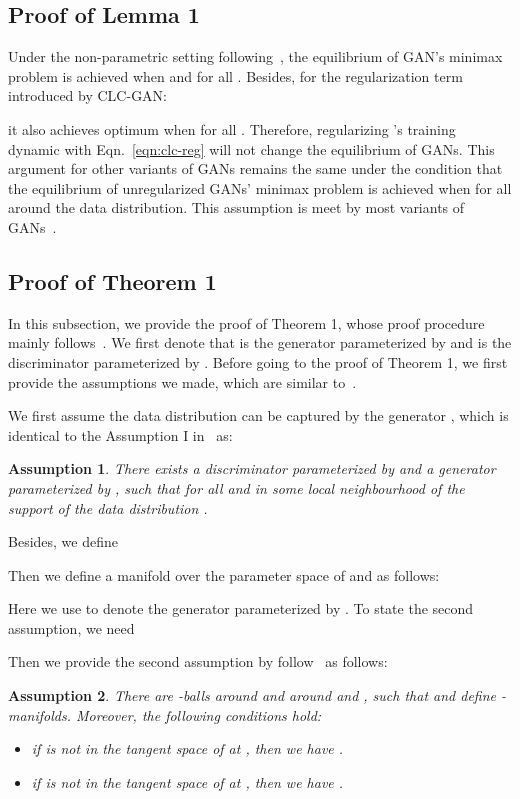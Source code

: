 \documentclass{article}
\newcommand{\eqn}[1]{Eqn.~\eqref{eqn:#1}}
\newtheorem{assumption}{Assumption}
\theoremstyle{definition}
\begin{document}
\subsection{Proof of Lemma 1}

Under the non-parametric setting following~\citet{goodfellow2014generative}, the equilibrium of GAN's minimax problem is achieved when  and  for all . Besides, for the regularization term introduced by CLC-GAN:

it also achieves optimum when  for all . Therefore, regularizing 's training dynamic with \eqn{clc-reg} will not change the equilibrium of GANs. This argument for other variants of GANs remains the same under the condition that the equilibrium of unregularized GANs' minimax problem is achieved when  for all  around the data distribution. This assumption is meet by most variants of GANs~\cite{arjovsky2017wasserstein,mao2017least,miyato2018spectral,zhang2019consistency}.

\subsection{Proof of Theorem 1}

In this subsection, we provide the proof of Theorem 1, whose proof procedure mainly follows~\citet{mescheder2018training}. We first denote that  is the generator parameterized by  and  is the discriminator parameterized by .
Before going to the proof of Theorem 1, we first provide the assumptions we made, which are similar to~\cite{mescheder2018training}.

We first assume the data distribution can be captured by the generator , which is identical to the Assumption I in~\cite{mescheder2018training} as:
\begin{assumption}
There exists a discriminator  parameterized by  and a generator  parameterized by , such that  for all  and  in some local neighbourhood of the support of the data distribution .
\label{ass1}
\end{assumption}

Besides, we define 

Then we define a manifold over the parameter space of  and  as follows:

Here we use  to denote the generator parameterized by . To state the second assumption, we need

Then we provide the second assumption by follow~\citet{mescheder2018training} as follows:
\begin{assumption}
There are -balls around  and  around  and , such that  and  define -manifolds. Moreover, the following conditions hold:
\begin{itemize}
    \item if  is not in the tangent space of  at , then we have .
    \item if  is not in the tangent space of  at , then we have .
\end{itemize}
\label{ass2}
\end{assumption}
\end{document}
